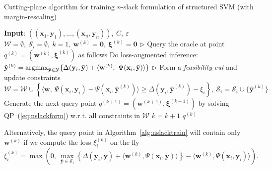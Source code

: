 \begin{algorithm}[htbp]
\caption{Cutting-plane algorithm for training $n$-slack formulation of structured SVM (with margin-rescaling)}
\label{alg:nslacktrain}
\begin{algorithmic}[1]
\STATE \textbf{Input}: $\left( (\mathbf{x}_1, \mathbf{y}_1), \dots, (\mathbf{x}_n, \mathbf{y}_n) \right),~ C,~ \varepsilon$
\STATE $\mathcal{W} = \emptyset,~\mathcal{S}_i = \emptyset,~ k = 1,~ \mathbf{w}^{(k)} = \mathbf{0},~ \bm{\xi}^{(k)} = \mathbf{0}$
\REPEAT
        \STATE $\triangleright$ Query the oracle at point $q^{(k)} = (\mathbf{w}^{(k)}, \bm{\xi}^{(k)})$ as follows
        \STATE Do loss-augmented inference:~
               $\hat{\mathbf{y}}^{(k)} = \operatorname*{argmax}_{\bar{\mathbf{y}} \in \mathcal{Y}} \{ \Delta(\mathbf{y}_i, \bar{\mathbf{y}}) + 
                \langle \mathbf{w}^{(k)},~ \Psi(\mathbf{x}_i, \bar{\mathbf{y}}) \rangle \}$ 
            \STATE $\triangleright$ Form a \emph{feasibility cut} and update constraints
            \STATE $\mathcal{W} = \mathcal{W} \cup 
                    \left\{ \langle \mathbf{w},~ \Psi(\mathbf{x}_i, \mathbf{y}_i) - \Psi(\mathbf{x}_i, \hat{\mathbf{y}}^{(k)}) \rangle \ge 
                    \Delta(\mathbf{y}_i, \hat{\mathbf{y}}^{(k)}) - \xi_i \right\},~ \mathcal{S}_i = \mathcal{S}_i \cup \{\hat{\mathbf{y}}^{(k)} \}$ 
            \STATE Generate the next query point $q^{(k+1)} = (\mathbf{w}^{(k+1)}, \bm{\xi}^{(k+1)})$ 
                   by solving QP~(\ref{eq:nslackform}) w.r.t. all constraints in $\mathcal{W}$
            \STATE $k = k+1$
        \ENDIF
    \ENDFOR
\RETURN $q^{(k)}$
\end{algorithmic}
\end{algorithm}

Alternatively, the query point in Algorithm~\ref{alg:nslacktrain} will contain only $\mathbf{w}^{(k)}$
if we compute the loss $\xi_i^{(k)}$ on the fly~\cite{tsochantaridis2004support}
\begin{equation*}
\xi_i^{(k)} = \max \left( 0,~ 
              \max_{\bar{\mathbf{y}} \in \mathcal{S}_i} 
              \left\{ \Delta(\mathbf{y}_i, \bar{\mathbf{y}}) + \langle \mathbf{w}^{(k)}, \Psi(\mathbf{x}_i, \bar{\mathbf{y}}) \rangle \right\} -
              \langle \mathbf{w}^{(k)}, \Psi(\mathbf{x}_i, \mathbf{y}_i) \rangle \right).
\end{equation*}


